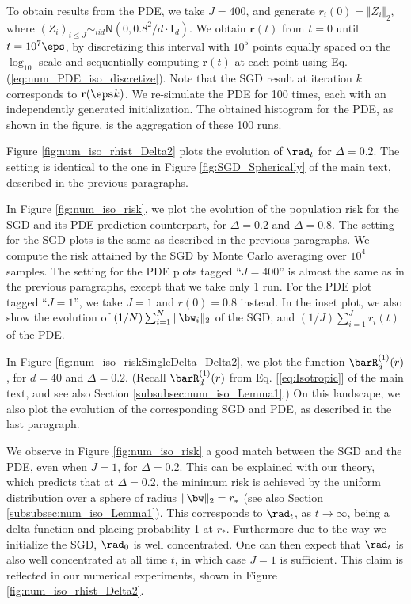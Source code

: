 \documentclass[11pt]{article}
\begin{document}
To obtain results from the PDE, we take $J=400$, and generate $r_i(0)=\Vert Z_i\Vert_2$, where $(Z_i)_{i\leq J}\sim_{iid}\mathsf{N}(0,0.8^2/d\cdot \mathbf{I}_d)$. We obtain $\mathbf{r}(t)$ from $t=0$ until $t=10^7\eps$, by discretizing this interval with $10^5$ points equally spaced on the $\log_{10}$ scale and sequentially computing $\mathbf{r}(t)$ at each point using Eq. (\ref{eq:num_PDE_iso_discretize}). Note that the SGD result at iteration $k$ corresponds to $\mathbf{r}(\eps k)$. We re-simulate the PDE for 100 times, each with an independently generated initialization. The obtained histogram for the PDE, as shown in the figure, is the aggregation of these 100 runs.

 Figure \ref{fig:num_iso_rhist_Delta2} plots the evolution of $\rad_t$ for $\Delta=0.2$. The setting is identical to the one in Figure \ref{fig:SGD_Spherically} of the main text, described in the previous paragraphs.

In Figure \ref{fig:num_iso_risk}, we plot the evolution of the population risk for the SGD and its PDE prediction counterpart, for $\Delta=0.2$ and $\Delta=0.8$. The setting for the SGD plots is the same as described in the previous paragraphs. We compute the risk attained by the SGD by Monte Carlo averaging over $10^4$ samples. The setting for the PDE plots tagged ``$J=400$'' is almost the same as in the previous paragraphs, except that we take only 1 run. For the PDE plot tagged ``$J=1$'', we take $J=1$ and $r(0)=0.8$ instead. In the inset plot, we also show the evolution of $(1/N)\sum_{i=1}^N\Vert\bw_i\Vert_2$ of the SGD, and $(1/J)\sum_{i=1}^Jr_i(t)$ of the PDE.

In Figure \ref{fig:num_iso_riskSingleDelta_Delta2}, we plot the function $\barR^{(1)}_d(r)$, for $d=40$ and $\Delta=0.2$. (Recall $\barR^{(1)}_d(r)$ from Eq. [\ref{eq:Isotropic}] of the main text, and see also Section \ref{subsubsec:num_iso_Lemma1}.) On this landscape, we also plot the evolution of the corresponding SGD and PDE, as described in the last paragraph.

 We observe in Figure \ref{fig:num_iso_risk} a good match between the SGD and the PDE, even when $J=1$, for $\Delta=0.2$. This can be explained with our theory, which predicts that at $\Delta=0.2$, the minimum risk is achieved by the uniform distribution over a sphere of radius $\Vert\bw\Vert_2=r_*$ (see also Section \ref{subsubsec:num_iso_Lemma1}). This corresponds to $\rad_t$, as $t\to\infty$, being a delta function and placing probability 1 at $r_*$. Furthermore due to the way we initialize the SGD, $\rad_0$ is well concentrated. One can then expect that $\rad_t$ is also well concentrated at all time $t$, in which case $J=1$ is sufficient. This claim is reflected in our numerical experiments, shown in Figure \ref{fig:num_iso_rhist_Delta2}.
\end{document}
